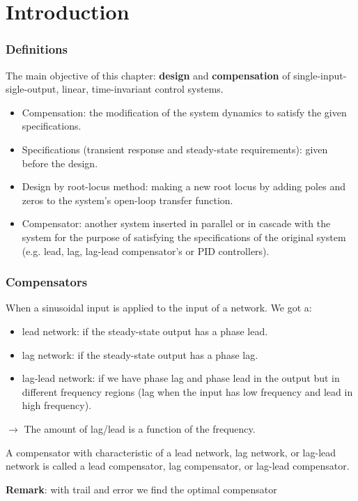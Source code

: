 \section{Introduction}

\begin{frame}
	\frametitle{Definitions}
		The main objective of this chapter: \textbf{design} and \textbf{compensation} of single-input-sigle-output, linear, time-invariant control systems.
		\begin{itemize}
			\item Compensation: the modification of the system dynamics to satisfy the given specifications.
			\item Specifications (transient response and steady-state requirements): given before the design.
			\item Design by root-locus method: making a new root locus by adding poles and zeros to the system's open-loop transfer function.
			\item Compensator: another system inserted in parallel or in cascade with the system for the purpose of satisfying the specifications of the original system (e.g. lead, lag, lag-lead compensator's or PID controllers).
		\end{itemize}
\end{frame}

\begin{frame}
	\frametitle{Compensators}
	When a sinusoidal input is applied to the input of a network. We got a:
	\begin{itemize}
		\item lead network: if the steady-state output has a phase lead.
		\item lag network: if the steady-state output has a phase lag.
		\item lag-lead network: if we have phase lag and phase lead in the output but in different frequency regions (lag when the input has low frequency and lead in high frequency). 
	\end{itemize}
	$\rightarrow$ The amount of lag/lead is a function of the frequency. \vspace{4mm}
	
	A compensator with characteristic of a lead network, lag network, or lag-lead network is called a lead compensator, lag compensator, or lag-lead compensator. 
	
	\textbf{Remark}: with trail and error we find the optimal compensator
\end{frame}

